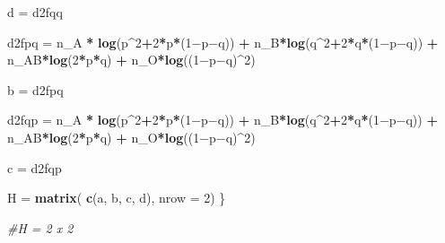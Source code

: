 \documentclass[]{article}
\newenvironment{Shaded}{\begin{snugshade}}{\end{snugshade}}
\newcommand{\KeywordTok}[1]{\textcolor[rgb]{0.13,0.29,0.53}{\textbf{#1}}}
\newcommand{\DataTypeTok}[1]{\textcolor[rgb]{0.13,0.29,0.53}{#1}}
\newcommand{\DecValTok}[1]{\textcolor[rgb]{0.00,0.00,0.81}{#1}}
\newcommand{\StringTok}[1]{\textcolor[rgb]{0.31,0.60,0.02}{#1}}
\newcommand{\CommentTok}[1]{\textcolor[rgb]{0.56,0.35,0.01}{\textit{#1}}}
\newcommand{\OperatorTok}[1]{\textcolor[rgb]{0.81,0.36,0.00}{\textbf{#1}}}
\newcommand{\NormalTok}[1]{#1}
\begin{document}
\begin{Shaded}
\begin{Highlighting}[]
    
\NormalTok{     d =}\StringTok{ }\NormalTok{d2fqq}
    
\NormalTok{    d2fpq =}\StringTok{ }\NormalTok{n_A }\OperatorTok{*}\StringTok{ }\KeywordTok{log}\NormalTok{(p}\OperatorTok{^}\DecValTok{2}\OperatorTok{+}\DecValTok{2}\OperatorTok{*}\NormalTok{p}\OperatorTok{*}\NormalTok{(}\DecValTok{1}\NormalTok{−p−q)) }\OperatorTok{+}\StringTok{ }\NormalTok{n_B}\OperatorTok{*}\KeywordTok{log}\NormalTok{(q}\OperatorTok{^}\DecValTok{2}\OperatorTok{+}\DecValTok{2}\OperatorTok{*}\NormalTok{q}\OperatorTok{*}\NormalTok{(}\DecValTok{1}\NormalTok{−p−q)) }\OperatorTok{+}\StringTok{ }\NormalTok{n_AB}\OperatorTok{*}\KeywordTok{log}\NormalTok{(}\DecValTok{2}\OperatorTok{*}\NormalTok{p}\OperatorTok{*}\NormalTok{q) }\OperatorTok{+}\StringTok{ }\NormalTok{n_O}\OperatorTok{*}\KeywordTok{log}\NormalTok{((}\DecValTok{1}\NormalTok{−p−q)}\OperatorTok{^}\DecValTok{2}\NormalTok{) }
    
\NormalTok{     b =}\StringTok{ }\NormalTok{d2fpq}

    
\NormalTok{    d2fqp =}\StringTok{ }\NormalTok{n_A }\OperatorTok{*}\StringTok{ }\KeywordTok{log}\NormalTok{(p}\OperatorTok{^}\DecValTok{2}\OperatorTok{+}\DecValTok{2}\OperatorTok{*}\NormalTok{p}\OperatorTok{*}\NormalTok{(}\DecValTok{1}\NormalTok{−p−q)) }\OperatorTok{+}\StringTok{ }\NormalTok{n_B}\OperatorTok{*}\KeywordTok{log}\NormalTok{(q}\OperatorTok{^}\DecValTok{2}\OperatorTok{+}\DecValTok{2}\OperatorTok{*}\NormalTok{q}\OperatorTok{*}\NormalTok{(}\DecValTok{1}\NormalTok{−p−q)) }\OperatorTok{+}\StringTok{ }\NormalTok{n_AB}\OperatorTok{*}\KeywordTok{log}\NormalTok{(}\DecValTok{2}\OperatorTok{*}\NormalTok{p}\OperatorTok{*}\NormalTok{q) }\OperatorTok{+}\StringTok{ }\NormalTok{n_O}\OperatorTok{*}\KeywordTok{log}\NormalTok{((}\DecValTok{1}\NormalTok{−p−q)}\OperatorTok{^}\DecValTok{2}\NormalTok{) }
    
\NormalTok{     c =}\StringTok{ }\NormalTok{d2fqp}

\NormalTok{    H =}\StringTok{ }\KeywordTok{matrix}\NormalTok{( }\KeywordTok{c}\NormalTok{(a, b, c, d), }\DataTypeTok{nrow =} \DecValTok{2}\NormalTok{)}
\NormalTok{\}}

\CommentTok{#H = 2 x 2}
\end{Highlighting}
\end{Shaded}
\end{document}
